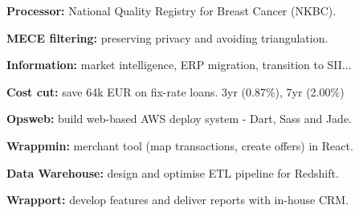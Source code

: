 \documentclass[a4paper]{MagicalCV}
\begin{document}
\begin{minipage}[t]{0.66\textwidth}
\hfill
{}
\vspace{\topsep} %
\begin{tightemize}
\item {\bf Processor:} National Quality Registry for Breast Cancer (NKBC).
\item {\bf MECE filtering:} preserving privacy and avoiding triangulation.
\end{tightemize}
\sectionsep

\hfill
{}
\vspace{\topsep} %
\begin{tightemize}
\item {\bf Information:} market intelligence, ERP migration, transition to SII...
\item {\bf Cost cut:} save 64k EUR on fix-rate loans. 3yr (0.87\%), 7yr (2.00\%)
\end{tightemize}
\sectionsep

\hfill
{}
\vspace{\topsep} %
\begin{tightemize}
\item {\bf Opsweb:} build web-based AWS deploy system - Dart, Sass and Jade.
\item {\bf Wrappmin:} merchant tool (map transactions, create offers) in React.
\end{tightemize}
\sectionsep

\hfill
{}
\vspace{\topsep} %
\begin{tightemize}
\item {\bf Data Warehouse:} design and optimise ETL pipeline for Redshift.
\item {\bf Wrapport:} develop features and deliver reports with in-house CRM.
\end{tightemize}
\sectionsep


\end{minipage}
\end{document}
